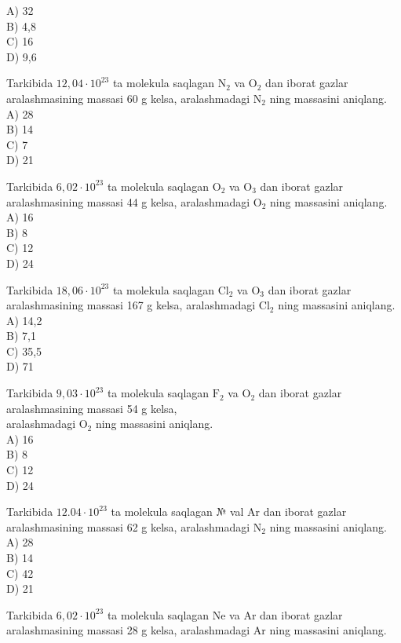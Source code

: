 A) 32\\
B) 4,8\\
C) 16\\
D) 9,6
  \item Tarkibida $12,04 \cdot 10^{23}$ ta molekula saqlagan $\mathrm{N}_{2}$ va $\mathrm{O}_{2}$ dan iborat gazlar aralashmasining massasi 60 g kelsa, aralashmadagi $\mathrm{N}_{2}$ ning massasini aniqlang.\\
A) 28\\
B) 14\\
C) 7\\
D) 21
  \item Tarkibida $6,02 \cdot 10^{23}$ ta molekula saqlagan $\mathrm{O}_{2}$ va $\mathrm{O}_{3}$ dan iborat gazlar aralashmasining massasi 44 g kelsa, aralashmadagi $\mathrm{O}_{2}$ ning massasini aniqlang.\\
A) 16\\
B) 8\\
C) 12\\
D) 24
  \item Tarkibida $18,06 \cdot 10^{23}$ ta molekula saqlagan $\mathrm{Cl}_{2}$ va $\mathrm{O}_{3}$ dan iborat gazlar aralashmasining massasi 167 g kelsa, aralashmadagi $\mathrm{Cl}_{2}$ ning massasini aniqlang.\\
A) 14,2\\
B) 7,1\\
C) 35,5\\
D) 71
  \item Tarkibida $9,03 \cdot 10^{23}$ ta molekula saqlagan $\mathrm{F}_{2}$ va $\mathrm{O}_{2}$ dan iborat gazlar aralashmasining massasi 54 g kelsa,\\
aralashmadagi $\mathrm{O}_{2}$ ning massasini aniqlang.\\
A) 16\\
B) 8\\
C) 12\\
D) 24
  \item Tarkibida $12.04 \cdot 10^{23}$ ta molekula saqlagan № val Ar dan iborat gazlar aralashmasining massasi 62 g kelsa, aralashmadagi $\mathrm{N}_{2}$ ning massasini aniqlang.\\
A) 28\\
B) 14\\
C) 42\\
D) 21
  \item Tarkibida $6,02 \cdot 10^{23}$ ta molekula saqlagan Ne va Ar dan iborat gazlar aralashmasining massasi 28 g kelsa, aralashmadagi Ar ning massasini aniqlang.\\
